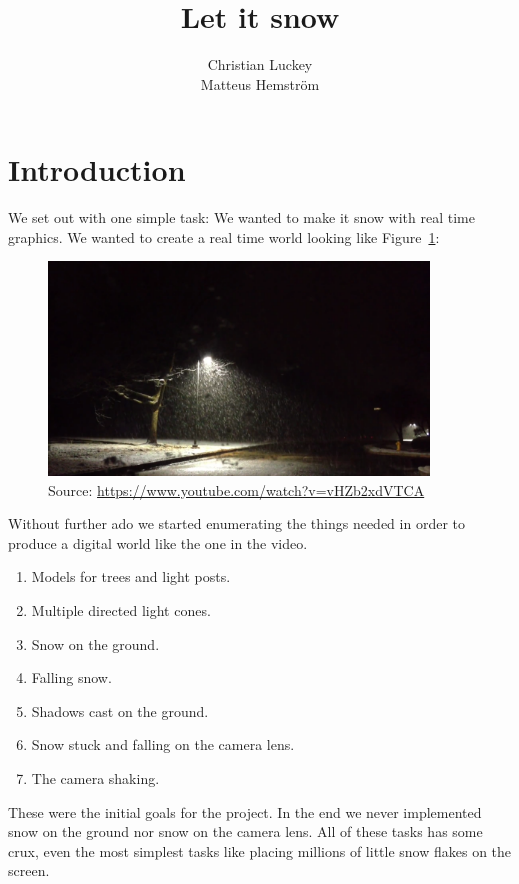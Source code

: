 \documentclass[a4paper,12pt]{article}
\title{Let it snow}
\author{Christian Luckey \\ Matteus Hemström}
\begin{document}
\maketitle

\newpage



\section{Introduction}

We set out with one simple task: We wanted to make it snow with real time graphics. We wanted to create a real time world looking like Figure~\ref{fig:youtube}:

\begin{figure}[ht]
  \centering
  \includegraphics[width=0.9\textwidth]{youtube}
  \caption{\label{fig:youtube} Source: \href{https://www.youtube.com/watch?v=vHZb2xdVTCA}{https://www.youtube.com/watch?v=vHZb2xdVTCA}}
\end{figure}

\noindent
Without further ado we started enumerating the things needed in order to produce a digital world like the one in the video. 

\begin{enumerate}
  \item Models for trees and light posts.
  \item Multiple directed light cones.
  \item Snow on the ground.
  \item Falling snow.
  \item Shadows cast on the ground.
  \item Snow stuck and falling on the camera lens.
  \item The camera shaking.
\end{enumerate}

These were the initial goals for the project. In the end we never implemented snow on the ground nor snow on the camera lens. All of these tasks has some crux, even the most simplest tasks like placing millions of little snow flakes on the screen.
\end{document}
